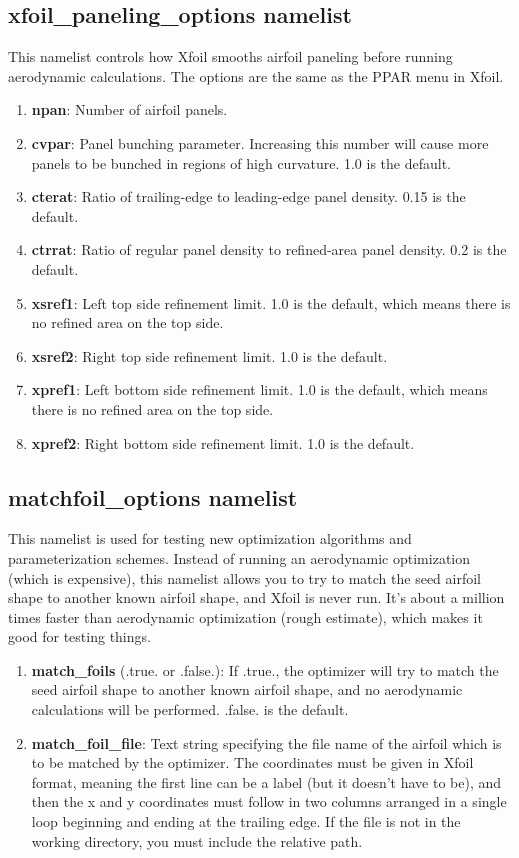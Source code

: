 \documentclass[11pt]{article}
\begin{document}
\subsection{xfoil\_paneling\_options namelist}

This namelist controls how Xfoil smooths airfoil paneling before running aerodynamic
calculations.  The options are the same as the PPAR menu in Xfoil.

\begin{enumerate}
\item{\textbf{npan}: Number of airfoil panels.}
\item{\textbf{cvpar}: Panel bunching parameter.  Increasing this number will cause more
panels to be bunched in regions of high curvature. 1.0 is the default.}
\item{\textbf{cterat}: Ratio of trailing-edge to leading-edge panel density.  0.15 is the
default.}
\item{\textbf{ctrrat}: Ratio of regular panel density to refined-area panel density.  0.2
is the default.}
\item{\textbf{xsref1}: Left top side refinement limit.  1.0 is the default, which means
there is no refined area on the top side.}
\item{\textbf{xsref2}: Right top side refinement limit.  1.0 is the default.}
\item{\textbf{xpref1}: Left bottom side refinement limit.  1.0 is the default, which means
there is no refined area on the top side.}
\item{\textbf{xpref2}: Right bottom side refinement limit.  1.0 is the default.}
\end{enumerate}

\subsection{matchfoil\_options namelist}

This namelist is used for testing new optimization algorithms and parameterization
schemes.  Instead of running an aerodynamic optimization (which is expensive), this
namelist allows you to try to match the seed airfoil shape to another known airfoil shape,
and Xfoil is never run.  It's about a million times faster than aerodynamic optimization
(rough estimate), which makes it good for testing things.

\begin{enumerate}
\item{\textbf{match\_foils} (.true. or .false.): If .true., the optimizer will try to
match the seed airfoil shape to another known airfoil shape, and no aerodynamic
calculations will be performed.  .false. is the default.}
\item{\textbf{match\_foil\_file}: Text string specifying the file name of the airfoil
which is to be matched by the optimizer.  The coordinates must be given in Xfoil format,
meaning the first line can be a label (but it doesn't have to be), and then the x and y
coordinates must follow in two columns arranged in a single loop beginning and ending at
the trailing edge. If the file is not in the working directory, you must include the
relative path.}
\end{enumerate}
\end{document}
